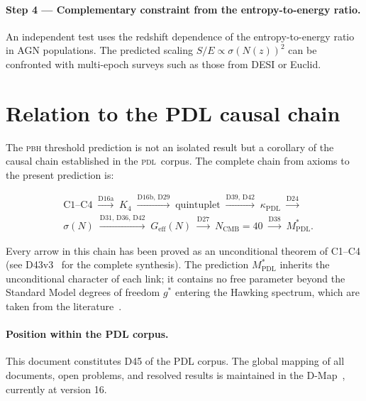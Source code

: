 \documentclass[12pt, a4paper]{article}
\theoremstyle{definition}
\newcommand{\PDL}{\textsc{pdl}}
\newcommand{\Geff}{G_{\mathrm{eff}}}
\newcommand{\sigN}{\sigma(N)}
\newcommand{\kappaPDL}{\kappa_{\mathrm{PDL}}}
\newcommand{\MstarPDL}{M^{*}_{\mathrm{PDL}}}
\begin{document}
\paragraph{Step 4 — Complementary constraint from the entropy-to-energy ratio.} An independent test uses the redshift dependence of the entropy-to-energy ratio in AGN populations. The predicted scaling $S/E \propto \sigma(N(z))^2$ can be confronted with multi-epoch surveys such as those from DESI or Euclid.

\section{Relation to the PDL causal chain}

The \textsc{pbh} threshold prediction is not an isolated result but a corollary of the causal chain established in the \PDL\ corpus. The complete chain from axioms to the present prediction is:

\begin{equation*}
\begin{split}
  &\mathrm{C1\text{--}C4}
  \;\xrightarrow{\text{D16a}}\; K_4
  \;\xrightarrow{\text{D16b, D29}}\; \text{quintuplet}
  \;\xrightarrow{\text{D39, D42}}\; \kappaPDL 
  \;\xrightarrow{\text{D24}}\; \\ &\sigN
  \;\xrightarrow{\text{D31, D36, D42}}\; \Geff(N)
  \;\xrightarrow{\text{D27}}\; N_{\mathrm{CMB}}=40
  \;\xrightarrow{\text{D38}}\; \MstarPDL.
\end{split}
\end{equation*}

Every arrow in this chain has been proved as an unconditional theorem of C1--C4 (see D43v3~\cite{D43v3} for the complete synthesis). The prediction $\MstarPDL$ inherits the unconditional character of each link; it contains no free parameter beyond the Standard Model degrees of freedom $g^*$ entering the Hawking spectrum, which are taken from the literature~\cite{Carr2021}.

\paragraph{Position within the PDL corpus.} This document constitutes D45 of the PDL corpus. The global mapping of all documents, open problems, and resolved results is maintained in the D-Map~\cite{DM}, currently at version 16.
\end{document}
